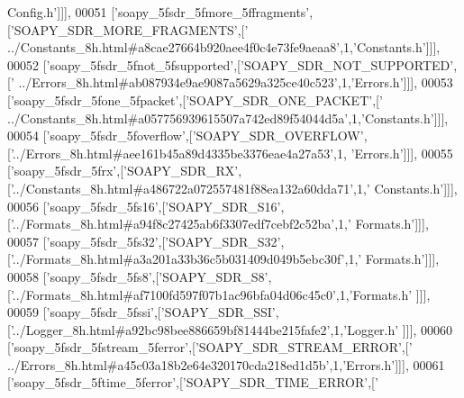 \begin{DoxyCode}
{      Config.h'}]]],
00051   [\textcolor{stringliteral}{'soapy\_5fsdr\_5fmore\_5ffragments'},[\textcolor{stringliteral}{'SOAPY\_SDR\_MORE\_FRAGMENTS'},[\textcolor{stringliteral}{'
      ../Constants\_8h.html#a8cae27664b920aee4f0c4e73fe9aeaa8'},1,\textcolor{stringliteral}{'Constants.h'}]]],
00052   [\textcolor{stringliteral}{'soapy\_5fsdr\_5fnot\_5fsupported'},[\textcolor{stringliteral}{'SOAPY\_SDR\_NOT\_SUPPORTED'},[\textcolor{stringliteral}{'
      ../Errors\_8h.html#ab087934e9ae9087a5629a325ce40c523'},1,\textcolor{stringliteral}{'Errors.h'}]]],
00053   [\textcolor{stringliteral}{'soapy\_5fsdr\_5fone\_5fpacket'},[\textcolor{stringliteral}{'SOAPY\_SDR\_ONE\_PACKET'},[\textcolor{stringliteral}{'
      ../Constants\_8h.html#a057756939615507a742ed89f54044d5a'},1,\textcolor{stringliteral}{'Constants.h'}]]],
00054   [\textcolor{stringliteral}{'soapy\_5fsdr\_5foverflow'},[\textcolor{stringliteral}{'SOAPY\_SDR\_OVERFLOW'},[\textcolor{stringliteral}{'../Errors\_8h.html#aee161b45a89d4335be3376eae4a27a53'},1,\textcolor{stringliteral}{
      'Errors.h'}]]],
00055   [\textcolor{stringliteral}{'soapy\_5fsdr\_5frx'},[\textcolor{stringliteral}{'SOAPY\_SDR\_RX'},[\textcolor{stringliteral}{'../Constants\_8h.html#a486722a072557481f88ea132a60dda71'},1,\textcolor{stringliteral}{'
      Constants.h'}]]],
00056   [\textcolor{stringliteral}{'soapy\_5fsdr\_5fs16'},[\textcolor{stringliteral}{'SOAPY\_SDR\_S16'},[\textcolor{stringliteral}{'../Formats\_8h.html#a94f8c27425ab6f3307edf7cebf2c52ba'},1,\textcolor{stringliteral}{'
      Formats.h'}]]],
00057   [\textcolor{stringliteral}{'soapy\_5fsdr\_5fs32'},[\textcolor{stringliteral}{'SOAPY\_SDR\_S32'},[\textcolor{stringliteral}{'../Formats\_8h.html#a3a201a33b36c5b031409d049b5ebc30f'},1,\textcolor{stringliteral}{'
      Formats.h'}]]],
00058   [\textcolor{stringliteral}{'soapy\_5fsdr\_5fs8'},[\textcolor{stringliteral}{'SOAPY\_SDR\_S8'},[\textcolor{stringliteral}{'../Formats\_8h.html#af7100fd597f07b1ac96bfa04d06c45c0'},1,\textcolor{stringliteral}{'Formats.h'}
      ]]],
00059   [\textcolor{stringliteral}{'soapy\_5fsdr\_5fssi'},[\textcolor{stringliteral}{'SOAPY\_SDR\_SSI'},[\textcolor{stringliteral}{'../Logger\_8h.html#a92bc98bee886659bf81444be215fafe2'},1,\textcolor{stringliteral}{'Logger.h'}
      ]]],
00060   [\textcolor{stringliteral}{'soapy\_5fsdr\_5fstream\_5ferror'},[\textcolor{stringliteral}{'SOAPY\_SDR\_STREAM\_ERROR'},[\textcolor{stringliteral}{'
      ../Errors\_8h.html#a45c03a18b2e64e320170cda218ed1d5b'},1,\textcolor{stringliteral}{'Errors.h'}]]],
00061   [\textcolor{stringliteral}{'soapy\_5fsdr\_5ftime\_5ferror'},[\textcolor{stringliteral}{'SOAPY\_SDR\_TIME\_ERROR'},[\textcolor{stringliteral}{'
}
\end{DoxyCode}
